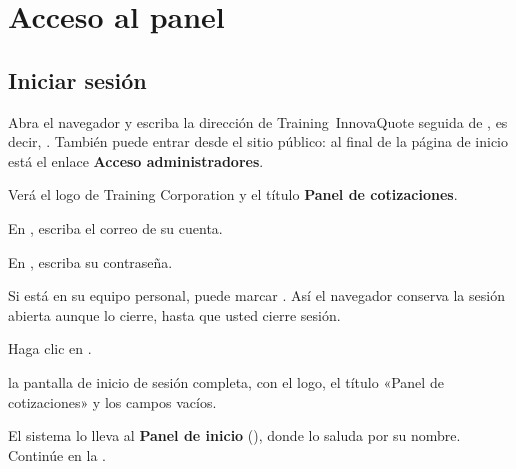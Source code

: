 \chapter{Acceso al panel}\label{cap:acceso}


\section{Iniciar sesión}\label{sec:iniciar-sesion}


\begin{pasos}
  \item Abra el navegador y escriba la dirección de Training~InnovaQuote seguida de , es decir,
        .
        También puede entrar desde el sitio público: al final de la página de inicio está el
        enlace \textbf{Acceso administradores}.
  \item Verá el logo de Training Corporation y el título \textbf{Panel de cotizaciones}.
  \item En , escriba el correo de su cuenta.
  \item En , escriba su contraseña.
  \item Si está en su equipo personal, puede marcar . Así el
        navegador conserva la sesión abierta aunque lo cierre, hasta que usted cierre sesión.
  \item Haga clic en .
\end{pasos}

  {la pantalla de inicio de sesión completa, con el logo, el título «Panel de cotizaciones»
   y los campos vacíos.}

\begin{resultado}
El sistema lo lleva al \textbf{Panel de inicio} (), donde lo saluda por su
nombre. Continúe en la .
\end{resultado}

